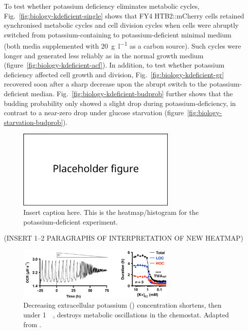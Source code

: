 To test whether potassium deficiency eliminates metabolic cycles, Fig.\ \ref{fig:biology-kdeficient-single} shows that FY4 HTB2::mCherry cells retained synchronised metabolic cycles and cell division cycles when cells were abruptly switched from potassium-containing to potassium-deficient minimal medium (both media supplemented with \SI{20}{\gram~\litre^{-1}} as a carbon source).
Such cycles were longer and generated less reliably as in the normal growth medium (figure~\ref{fig:biology-kdeficient-acf}).
In addition, to test whether potassium deficiency affected cell growth and division, Fig.\ \ref{fig:biology-kdeficient-gr} recovered soon after a sharp decrease upon the abrupt switch to the potassium-deficient median.
Fig.\ \ref{fig:biology-kdeficient-budprob} further shows that the budding probability only showed a slight drop during potassium-deficiency, in contrast to a near-zero drop under glucose starvation (figure~\ref{fig:biology-starvation-budprob}).

\begin{figure}
  \centering
  \includegraphics[width=0.7\textwidth]{placeholder01.pdf}
  \caption{
    Insert caption here.
    This is the heatmap/histogram for the potassium-deficient experiment.
  }
  \label{fig:biology-kdeficient-heatmap}
\end{figure}

(INSERT 1--2 PARAGRAPHS OF INTERPRETATION OF NEW HEATMAP)


\begin{figure}
  \centering
  \includegraphics[width=0.7\textwidth]{oneillEukaryoticCellBiology2020_4_adapted.png}
  \caption{
    Decreasing extracellular potassium () concentration shortens, then under \SI{1}{\milli\molar}, destroys metabolic oscillations in the chemostat.
    Adapted from \textcite{oneillEukaryoticCellBiology2020}.
  }
  \label{fig:biology-kdeficient-oneill}
\end{figure}

